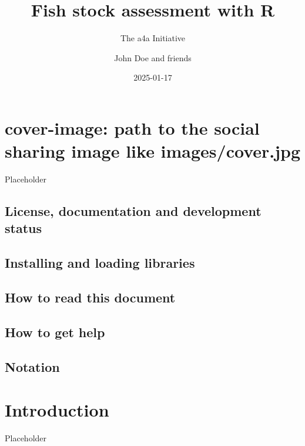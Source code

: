 \documentclass[
]{book}
\title{Fish stock assessment with R}
\subtitle{The a4a Initiative}
\author{John Doe and friends}
\date{2025-01-17}
\begin{document}
\maketitle

{
\setcounter{tocdepth}{1}
\tableofcontents
}
\hypertarget{cover-image-path-to-the-social-sharing-image-like-imagescover.jpg}{%
\chapter{cover-image: path to the social sharing image like images/cover.jpg}\label{cover-image-path-to-the-social-sharing-image-like-imagescover.jpg}}

Placeholder

\hypertarget{license-documentation-and-development-status}{%
\section{License, documentation and development status}\label{license-documentation-and-development-status}}

\hypertarget{installing-and-loading-libraries}{%
\section{Installing and loading libraries}\label{installing-and-loading-libraries}}

\hypertarget{how-to-read-this-document}{%
\section{How to read this document}\label{how-to-read-this-document}}

\hypertarget{how-to-get-help}{%
\section{How to get help}\label{how-to-get-help}}

\hypertarget{notation}{%
\section{Notation}\label{notation}}

\hypertarget{introduction}{%
\chapter{Introduction}\label{introduction}}

Placeholder
\end{document}
